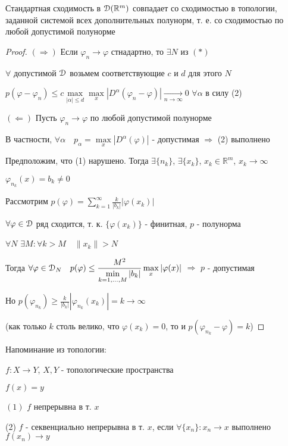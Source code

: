 \documentclass[a4paper,12pt]{report}
\begin{document}
\begin{thm}
Стандартная сходимость в $\EuScript D(\mathbb R^m)$ совпадает со сходимостью в топологии, заданной системой всех дополнительных полунорм, т. е. со сходимостью по любой допустимой полунорме
\end{thm}
\begin{proof}
$(\Rightarrow)$ Если $\varphi_n\to\varphi$ стнадартно, то $\exists N$ из $(*)$

$\forall$ допустимой $\EuScript D$ возьмем соответствующие $c$ и $d$ для этого $N$

$p(\varphi-\varphi_n)\le c\max\limits_{|\alpha|\le d}\max\limits_x|D^\alpha(\varphi_n-\varphi)|\xrightarrow[n\to\infty]{}0$ $\forall\alpha$ в силу (2)

$(\Leftarrow)$ Пусть $\varphi_n\to\varphi$ по любой допустимой полунорме

 В частности, $\forall\alpha\quad p_\alpha=\max\limits_x|D^\alpha(\varphi)|$ - допустимая $\Rightarrow$ (2) выполнено

Предположим, что (1) нарушено. Тогда $\exists\{n_k\}$, $\exists\{x_k\}$, $x_k\in\mathbb R^m$, $x_k\to\infty$

$\varphi_{n_k}(x)=b_k\ne0$

Рассмотрим $p(\varphi)=\sum\limits_{k=1}^\infty\displaystyle\frac{k}{|b_k|}|\varphi(x_k)|$

$\forall\varphi\in\EuScript D$ ряд сходится, т. к. $\{\varphi(x_k)\}$ - финитная, $p$ - полунорма

$\forall N$ $\exists M\colon\forall k>M\quad\|x_k\|>N$

Тогда $\forall\varphi\in\EuScript D_N\quad p(\varphi)\le\displaystyle\frac{M^2}{\min\limits_{k=1,\ldots,M}|b_k|}\max\limits_x|\varphi(x)|$ $\Rightarrow$ $p$ - допустимая

Но $p(\varphi_{n_k})\ge\displaystyle\frac{k}{|b_k|}|\varphi_{n_k}(x_k)|=k\to\infty$

(как только $k$ столь велико, что $\varphi(x_k)=0$, то и $p(\varphi_{n_k}-\varphi)=k$)
\end{proof}


Напоминание из топологии:

$f\colon X\to Y$, $X,Y$ - топологические пространства

$f(x)=y$

$(1)$ $f$ непрерывна в т. $x$

(2) $f$ - секвенциально непрерывна в т. $x$, если $\forall\{x_n\}\colon x_n\to x$ выполнено $f(x_n)\to y$
 
\end{document}
